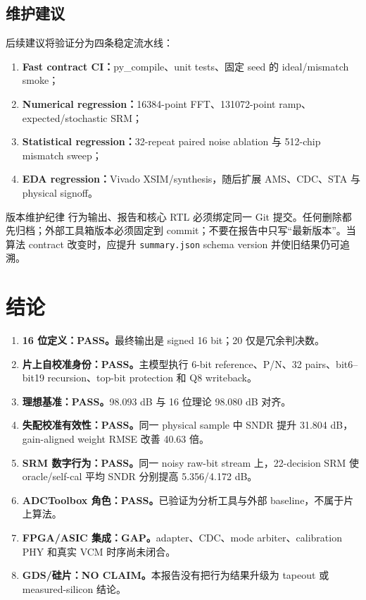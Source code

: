 \documentclass[UTF8,fontset=none,a4paper,11pt,openany]{ctexrep}
\newcommand{\statuspass}{\textcolor{RefGreen}{\textbf{PASS}}}
\newcommand{\statusgap}{\textcolor{RefOrange}{\textbf{GAP}}}
\newcommand{\statusnoclaim}{\textcolor{RefGray}{\textbf{NO CLAIM}}}
\begin{document}
\section{维护建议}

后续建议将验证分为四条稳定流水线：
\begin{enumerate}
  \item \textbf{Fast contract CI：}py\_compile、unit tests、固定 seed 的 ideal/mismatch smoke；
  \item \textbf{Numerical regression：}16384-point FFT、131072-point ramp、expected/stochastic SRM；
  \item \textbf{Statistical regression：}32-repeat paired noise ablation 与 512-chip mismatch sweep；
  \item \textbf{EDA regression：}Vivado XSIM/synthesis，随后扩展 AMS、CDC、STA 与 physical signoff。
\end{enumerate}

\begin{riskbox}{版本维护纪律}
行为输出、报告和核心 RTL 必须绑定同一 Git 提交。任何删除都先归档；外部工具箱版本必须固定到 commit；不要在报告中只写“最新版本”。当算法 contract 改变时，应提升 \texttt{summary.json} schema version 并使旧结果仍可追溯。
\end{riskbox}

\chapter{结论}

\begin{enumerate}
  \item \textbf{16 位定义：\statuspass。}最终输出是 signed 16 bit；20 仅是冗余判决数。
  \item \textbf{片上自校准身份：\statuspass。}主模型执行 6-bit reference、P/N、32 pairs、bit6--bit19 recursion、top-bit protection 和 Q8 writeback。
  \item \textbf{理想基准：\statuspass。}98.093 dB 与 16 位理论 98.080 dB 对齐。
  \item \textbf{失配校准有效性：\statuspass。}同一 physical sample 中 SNDR 提升 31.804 dB，gain-aligned weight RMSE 改善 40.63 倍。
  \item \textbf{SRM 数字行为：\statuspass。}同一 noisy raw-bit stream 上，22-decision SRM 使 oracle/self-cal 平均 SNDR 分别提高 5.356/4.172 dB。
  \item \textbf{ADCToolbox 角色：\statuspass。}已验证为分析工具与外部 baseline，不属于片上算法。
  \item \textbf{FPGA/ASIC 集成：\statusgap。}adapter、CDC、mode arbiter、calibration PHY 和真实 VCM 时序尚未闭合。
  \item \textbf{GDS/硅片：\statusnoclaim。}本报告没有把行为结果升级为 tapeout 或 measured-silicon 结论。
\end{enumerate}
\end{document}

